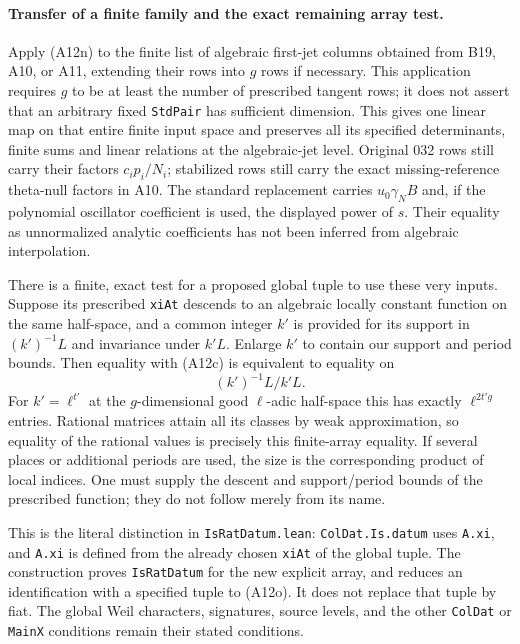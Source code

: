 \documentclass[11pt]{article}
\theoremstyle{definition}\newtheorem{definition}[theorem]{Definition}\newtheorem{remark}[theorem]{Remark}
\begin{document}
\paragraph{Transfer of a finite family and the exact remaining array test.}
Apply (A12n) to the finite list of algebraic first-jet
columns obtained from B19, A10, or A11, extending their
rows into $g$ rows if necessary.  This application requires
$g$ to be at least the number of prescribed tangent rows;
it does not assert that an arbitrary fixed \texttt{StdPair}
has sufficient dimension.  This gives one linear
map on that entire finite input space and preserves
all its specified determinants, finite sums and
linear relations at the algebraic-jet level.  Original
032 rows still carry their factors $c_ip_i/N_i$;
stabilized rows still carry the exact missing-reference
theta-null factors in A10.  The standard replacement
carries $u_0\gamma_NB$ and, if the polynomial oscillator
coefficient is used, the displayed power of $s$.
Their equality as unnormalized analytic coefficients
has not been inferred from algebraic interpolation.

There is a finite, exact test for a proposed global
tuple to use these very inputs.  Suppose its prescribed
\texttt{xiAt} descends to an algebraic locally constant
function on the same half-space, and a common integer
$k'$ is provided for its support in $(k')^{-1}L$
and invariance under $k'L$.  Enlarge $k'$ to contain
our support and period bounds.  Then equality with
(A12c) is equivalent to equality on
\[
                        (k')^{-1}L/k'L.
 \tag{A12o}
\]
For $k'=\ell^{t'}$ at the $g$-dimensional good
$\ell$-adic half-space this has exactly
$\ell^{2t'g}$ entries.  Rational matrices attain all
its classes by weak approximation, so equality of
the rational values is precisely this finite-array
equality.  If several places or additional periods
are used, the size is the corresponding product of
local indices.  One must supply the descent and
support/period bounds of the prescribed function;
they do not follow merely from its name.

This is the literal distinction in
\texttt{IsRatDatum.lean}: \texttt{ColDat.Is.datum}
uses \texttt{A.xi}, and \texttt{A.xi} is defined
from the already chosen \texttt{xiAt} of the global
tuple.  The construction proves \texttt{IsRatDatum}
for the new explicit array, and reduces an identification
with a specified tuple to (A12o).  It does not replace
that tuple by fiat.  The global Weil characters,
signatures, source levels, and the other \texttt{ColDat}
or \texttt{MainX} conditions remain their stated
conditions.
\end{document}
